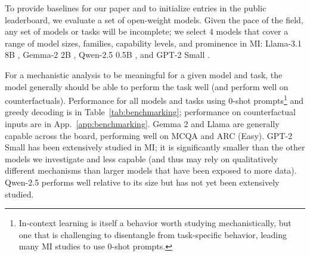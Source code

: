 \documentclass{article}
\theoremstyle{plain}
\theoremstyle{definition}
\theoremstyle{remark}
\newcommand{\arxiv}[1]{#1}
\begin{document}
\begin{table}[t]
    \centering
    \caption{Model performance (0-shot,  greedy generation) for all models and tasks on our public test splits. For results using ranked-choice scoring and more details on evaluation, see App.~\ref{app:benchmarking}.
    }
    \label{tab:benchmarking}
\end{table}


To provide baselines for our paper and to initialize entries in the public leaderboard, we evaluate a set of open-weight models. Given the pace of the field, any set of models or tasks will be incomplete; we select 4 models that cover a range of model sizes, families, capability levels, and prominence in MI:
Llama-3.1 8B \citep{llama3}, %
Gemma-2 2B \citep{team2024gemma},
Qwen-2.5 0.5B \citep{yang2024qwen2},
and GPT-2 Small \citep[117M,][]{radford2019language}.

For a mechanistic analysis to be meaningful for a given model and task, the model generally should be able to perform the task well (and perform well on counterfactuals). 
Performance for all models and tasks using 0-shot prompts\footnote{In-context learning is itself a behavior worth studying mechanistically, but one that is challenging to disentangle from task-specific behavior, leading many MI studies to use 0-shot prompts.} and greedy decoding is in Table~\ref{tab:benchmarking}; performance on counterfactual inputs are in App.~\ref{app:benchmarking}. Gemma 2 and Llama are generally capable across the board, performing well on MCQA and ARC (Easy). GPT-2 Small has been extensively studied in MI; it is significantly smaller than the other models we investigate and less capable (and thus may rely on qualitatively different mechanisms \arxiv{ than larger models that have been exposed to more data}). Qwen-2.5 performs well relative to its size but has not yet been extensively studied.
\end{document}
